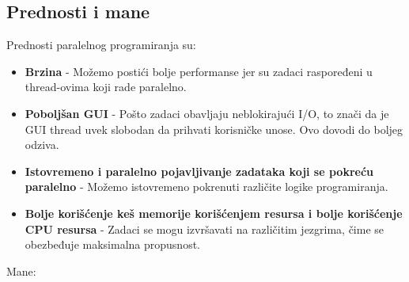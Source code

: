 \documentclass[a4paper]{article}
\begin{document}
{\subsection{Prednosti i mane}


Prednosti paralelnog programiranja su:\\

\begin{itemize}
\item \textbf{Brzina} - Možemo postići bolje performanse jer su zadaci raspoređeni u thread-ovima koji rade paralelno.\cite{zoboko}
\item \textbf{Poboljšan GUI} - Pošto zadaci obavljaju neblokirajući I/O, to znači da je GUI thread uvek slobodan da prihvati korisničke unose. Ovo dovodi do boljeg odziva.\cite{zoboko}
\item \textbf{Istovremeno i paralelno pojavljivanje zadataka koji se pokreću paralelno} - Možemo istovremeno pokrenuti različite logike programiranja.\cite{zoboko}
\item \textbf{Bolje korišćenje keš memorije korišćenjem resursa i bolje korišćenje CPU resursa} - Zadaci se mogu izvršavati na različitim jezgrima, čime se obezbeđuje maksimalna propusnost.\cite{zoboko}\\
\end{itemize}

Mane:\\

}
\end{document}

